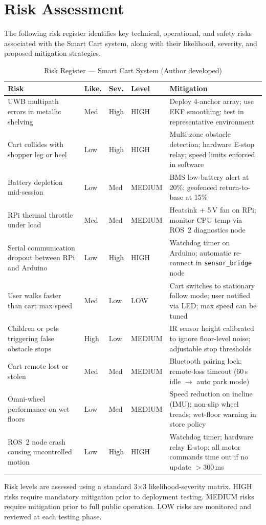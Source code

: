 \section{Risk Assessment}

The following risk register identifies key technical, operational, and
safety risks associated with the Smart Cart system, along with their
likelihood, severity, and proposed mitigation strategies.

\begin{table}[!ht]
\caption{Risk Register --- Smart Cart System (Author developed)}
\label{tab:risk}
\centering
\footnotesize
\begin{tabular}{p{1.5cm} p{0.8cm} p{0.8cm} p{0.8cm} p{2.5cm}}
\toprule
\textbf{Risk} & \textbf{Like.} & \textbf{Sev.} & \textbf{Level} & \textbf{Mitigation} \\
\midrule
UWB multipath errors in metallic shelving & Med & High & HIGH & Deploy 4-anchor array; use EKF smoothing; test in representative environment \\
Cart collides with shopper leg or heel & Low & High & HIGH & Multi-zone obstacle detection; hardware E-stop relay; speed limits enforced in software \\
Battery depletion mid-session & Low & Med & MEDIUM & BMS low-battery alert at 20\%; geofenced return-to-base at 15\% \\
RPi thermal throttle under load & Med & Med & MEDIUM & Heatsink + 5\,V fan on RPi; monitor CPU temp via ROS~2 diagnostics node \\
Serial communication dropout between RPi and Arduino & Low & High & HIGH & Watchdog timer on Arduino; automatic re-connect in \texttt{sensor\_bridge} node \\
User walks faster than cart max speed & Med & Low & LOW & Cart switches to stationary follow mode; user notified via LED; max speed can be tuned \\
Children or pets triggering false obstacle stops & High & Low & MEDIUM & IR sensor height calibrated to ignore floor-level noise; adjustable stop thresholds \\
Cart remote lost or stolen & Med & Med & MEDIUM & Bluetooth pairing lock; remote-loss timeout (60\,s idle $\to$ auto park mode) \\
Omni-wheel performance on wet floors & Low & Med & MEDIUM & Speed reduction on incline (IMU); non-slip wheel treads; wet-floor warning in store policy \\
ROS~2 node crash causing uncontrolled motion & Low & High & HIGH & Watchdog timer; hardware relay E-stop; all motor commands time out if no update $>$300\,ms \\
\bottomrule
\end{tabular}
\end{table}

Risk levels are assessed using a standard 3$\times$3
likelihood-severity matrix. HIGH risks require mandatory mitigation prior
to deployment testing. MEDIUM risks require mitigation prior to full
public operation. LOW risks are monitored and reviewed at each testing
phase.
